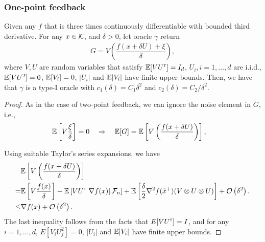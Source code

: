 \subsubsection*{One-point feedback}
\begin{proposition}
\label{prop:grad-1spsa}
Given any $f$ that is three times continuously differentiable with bounded third derivative. 
For any $x \in \mathcal{K}$, and $\delta >0$, let oracle $\gamma$ return 
\begin{align}
G =  V \left(\dfrac{f(x+\delta U) + \xi}{\delta}\right),
 \label{eq:onesp}
\end{align}
where $V, U$ are random variables that satisfy $\mathbb{E}[V U^\mathsf{\scriptscriptstyle T}] = I_d$, $U_i, i=1,\ldots,d$ are i.i.d., $\mathbb{E}[ V U^2] = 0$, $\mathbb{E}[V_i]=0$, $|U_i|$ and $\mathbb{E}|V_i|$ have finite upper bounds. 
Then, we have that $\gamma$ is a type-I oracle with $c_1(\delta) = C_1 \delta^2$ and $c_2(\delta) = C_2/\delta^2$.
\end{proposition}
\begin{proof}
As in the case of two-point feedback, we can ignore the noise element in $G$, i.e.,
\begin{align*}
&\mathbb{E}\left[  V\dfrac{\xi}{\delta} \right]= 0 \quad \Rightarrow \quad
\mathbb{E}[G] =  \mathbb{E}\left[ V \left(\dfrac{f(x+\delta U) }{\delta}\right)\right],
\end{align*}

Using suitable Taylor's series expansions, we have %
\begin{align}
&\mathbb{E}\left[V\left(\dfrac{f(x+\delta U)}{\delta}\right) \right] \nonumber\\
= & \mathbb{E}\left[V \dfrac{f(x)}{\delta} \right] + \mathbb{E}\left[V U^\mathsf{\scriptscriptstyle T} \left.\nabla f(x)\right| \mathcal{F}_n\right]  +   \mathbb{E}\left[\frac{\delta}{2}  \nabla^2 f(\tilde  x^+)(V \otimes U \otimes U)\right] + \mathcal{O}\left( \delta^2\right). \label{eq:l1}\\
\le & \nabla f(x) + \mathcal{O}\left( \delta^2\right).\label{eq:l2}
\end{align}
The last inequality follows from the facts that $E[V U^\mathsf{\scriptscriptstyle T}] = I$, and for any $i=1,\ldots,d$, $E[V_i U_j^2] = 0$, $|U_i|$ and $\mathbb{E}|V_i|$ have finite upper bounds.
\end{proof}

